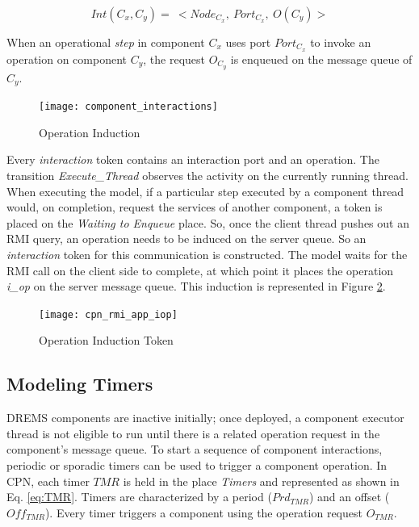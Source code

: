 \begin{equation}
\label{eq:component_interactions}
Int(C_x, C_y) = \ < Node_{C_x}, \ Port_{C_x}, \ O(C_y)>
\end{equation}

When an operational \emph{step} in component $C_x$ uses port $Port_{C_x}$ to invoke an operation on component $C_y$, the request $O_{C_y}$ is enqueued on the message queue of $C_y$. 

 \begin{figure}[ht]
 	\centering
 	\texttt{[image: component\_interactions]}
 	\caption{Operation Induction}
 	\label{fig:cpn_iop}
 \end{figure} 
 
Every \emph{interaction} token contains an interaction port and an operation. The transition \emph{Execute\_Thread} observes the activity on the currently running thread. When executing the model, if a particular step executed by a component thread would, on completion, request the services of another component, a token is placed on the \emph{Waiting to Enqueue} place. So, once the client thread pushes out an RMI query, an operation needs to be induced on the server queue. So an \emph{interaction} token for this communication is constructed. The model waits for the RMI call on the client side to complete, at which point it places the operation \emph{i\_op} on the server message queue. This induction is represented in Figure \ref{fig:cpn_rmi_app_iop}. 

 \begin{figure}[h]
 	\centering
 	\texttt{[image: cpn\_rmi\_app\_iop]}
 	\caption{Operation Induction Token}
 	\label{fig:cpn_rmi_app_iop}
 \end{figure}

\subsection{Modeling Timers}

DREMS components are inactive initially; once deployed, a component executor thread is not eligible to run until there is a related operation request in the component's message queue. To start a sequence of component interactions, periodic or sporadic timers can be used to trigger a component operation. In CPN, each timer $TMR$ is held in the place \emph{Timers} and represented as shown in Eq. \ref{eq:TMR}. Timers are characterized by a period ($Prd_{TMR}$) and an offset ($Off_{TMR}$). Every timer triggers a component using the operation request $O_{TMR}$.

